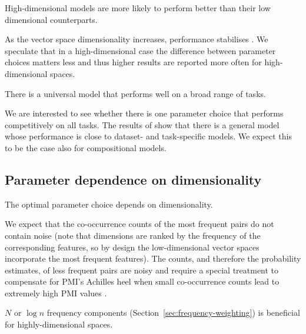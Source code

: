 \begin{hyp}
\label{hyp:var}
High-dimensional models are more likely to perform better than their low dimensional counterparts.
\end{hyp}

As the vector space dimensionality increases, performance stabilises \cite{kiela-clark:2014:CVSC,BullinariaLevy2012,lapesa2014large}. We speculate that in a high-dimensional case the difference between parameter choices matters less and thus higher results are reported more often for high-dimensional spaces.

\begin{hyp}
\label{hyp:universal}
There is a universal model that performs well on a broad range of tasks.
\end{hyp}

We are interested to see whether there is one parameter choice that performs competitively on all tasks. The results of \citet{lapesa2014large} show that there is a general model whose performance is close to dataset- and task-specific models. We expect this to be the case also for compositional models.

\subsection{Parameter dependence on dimensionality}
\label{sec:hyp-dimen}

\begin{hyp}
\label{hyp:dimen}
The optimal parameter choice depends on dimensionality.
\end{hyp}


We expect that the co-occurrence counts of the most frequent pairs do not contain noise (note that dimensions are ranked by the frequency of the corresponding features, so by design the low-dimensional vector spaces incorporate the most frequent features). The counts, and therefore the probability estimates, of less frequent pairs are noisy and require a special treatment to compensate for PMI's Achilles heel when small co-occurrence counts lead to extremely high PMI values \cite{TACL570}.

\begin{hyp}
  \label{hyp:freq}
 $N$ or $\log n$ frequency components (Section~\ref{sec:frequency-weighting}) is beneficial for highly-dimensional spaces.
\end{hyp}


